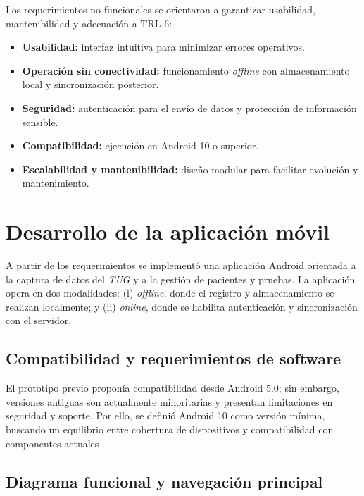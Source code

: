 \documentclass[12pt]{report}
\begin{document}
\begin{justify}
    Los requerimientos no funcionales se orientaron a garantizar usabilidad, mantenibilidad y adecuación a TRL 6:

    \begin{itemize}
        \item \textbf{Usabilidad:} interfaz intuitiva para minimizar errores operativos.
        \item \textbf{Operación sin conectividad:} funcionamiento \textit{offline} con almacenamiento local y sincronización posterior.
        \item \textbf{Seguridad:} autenticación para el envío de datos y protección de información sensible.
        \item \textbf{Compatibilidad:} ejecución en Android 10 o superior.
        \item \textbf{Escalabilidad y mantenibilidad:} diseño modular para facilitar evolución y mantenimiento.
    \end{itemize}

    \section{Desarrollo de la aplicación móvil}
    \label{sec:desarrollo-movil}

    A partir de los requerimientos se implementó una aplicación Android orientada a la captura de datos del \textit{TUG} y a la gestión de pacientes y pruebas. La aplicación opera en dos modalidades: (i) \textit{offline}, donde el registro y almacenamiento se realizan localmente; y (ii) \textit{online}, donde se habilita autenticación y sincronización con el servidor.

    \subsection{Compatibilidad y requerimientos de software}
    \label{subsec:requisitos-software}

    El prototipo previo \cite{Sistema-portable-TUG-AKuleshov} proponía compatibilidad desde Android 5.0; sin embargo, versiones antiguas son actualmente minoritarias y presentan limitaciones en seguridad y soporte. Por ello, se definió Android 10 como versión mínima, buscando un equilibrio entre cobertura de dispositivos y compatibilidad con componentes actuales \cite{Android-versions-2023}.

    \subsection{Diagrama funcional y navegación principal}
    \label{subsec:diagrama-funcional}


\end{justify}
\end{document}
